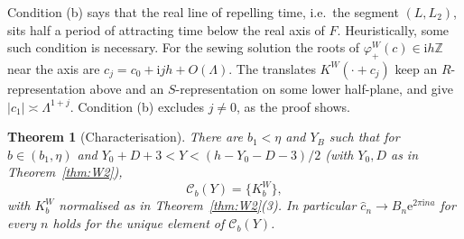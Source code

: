 \documentclass[11pt]{amsart}
\newtheorem{theorem}{Theorem}[section]
\theoremstyle{definition}
\newcommand{\Rr}{R}
\newcommand{\Kk}{K}
\newcommand{\eee}{\mathrm{e}}
\newcommand{\ii}{\mathrm{i}}
\begin{document}
Condition (b) says that the real line of repelling time, i.e.\ the segment
$(L,L_2)$, sits half a period of attracting time below the real axis of $F$.
Heuristically, some such condition is necessary.  For the sewing solution the
roots of $\varphi^W_+(c)\in\ii h\mathbb Z$ near the axis are
$c_j=c_0+\ii jh+O(\Lambda)$.  The translates $\Kk^W(\cdot+c_j)$ keep an
$\Rr$-representation above and an $S$-representation on some lower half-plane,
and give $|c_1|\asymp\Lambda^{1+j}$.  Condition (b) excludes $j\ne0$, as the
proof shows.

\begin{theorem}[Characterisation]\label{thm:char}
There are $b_1<\eta$ and $Y_B$ such that for $b\in(b_1,\eta)$ and
$Y_0+D+3<Y<(h-Y_0-D-3)/2$ (with $Y_0,D$ as in Theorem~\ref{thm:W2}),
\[
 \mathcal C_b(Y)=\{\Kk^W_b\},
\]
with $\Kk^W_b$ normalised as in Theorem~\ref{thm:W2}(3).  In particular
$\hat c_n\to B_n\eee^{2\pi\ii na}$ for every $n$ holds for the unique element
of $\mathcal C_b(Y)$.
\end{theorem}
\end{document}
